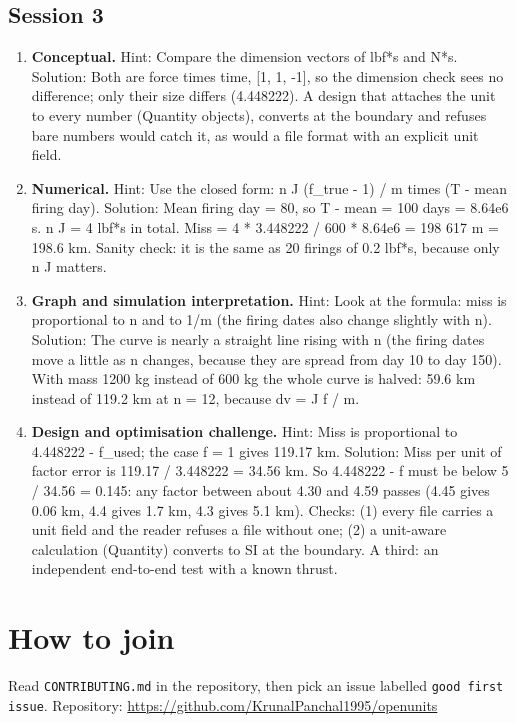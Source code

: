 \documentclass[11pt,a4paper]{article}
\begin{document}
\subsection*{Session 3}
\begin{enumerate}[nosep]
\item \textbf{Conceptual.} Hint: Compare the dimension vectors of lbf*s and N*s. Solution: Both are force times time, [1, 1, -1], so the dimension check sees no difference; only their size differs (4.448222). A design that attaches the unit to every number (Quantity objects), converts at the boundary and refuses bare numbers would catch it, as would a file format with an explicit unit field.
\item \textbf{Numerical.} Hint: Use the closed form: n J (f\_true - 1) / m times (T - mean firing day). Solution: Mean firing day = 80, so T - mean = 100 days = 8.64e6 s. n J = 4 lbf*s in total. Miss = 4 * 3.448222 / 600 * 8.64e6 = 198 617 m = 198.6 km. Sanity check: it is the same as 20 firings of 0.2 lbf*s, because only n J matters.
\item \textbf{Graph and simulation interpretation.} Hint: Look at the formula: miss is proportional to n and to 1/m (the firing dates also change slightly with n). Solution: The curve is nearly a straight line rising with n (the firing dates move a little as n changes, because they are spread from day 10 to day 150). With mass 1200 kg instead of 600 kg the whole curve is halved: 59.6 km instead of 119.2 km at n = 12, because dv = J f / m.
\item \textbf{Design and optimisation challenge.} Hint: Miss is proportional to \textbar{}4.448222 - f\_used\textbar{}; the case f = 1 gives 119.17 km. Solution: Miss per unit of factor error is 119.17 / 3.448222 = 34.56 km. So \textbar{}4.448222 - f\textbar{} must be below 5 / 34.56 = 0.145: any factor between about 4.30 and 4.59 passes (4.45 gives 0.06 km, 4.4 gives 1.7 km, 4.3 gives 5.1 km). Checks: (1) every file carries a unit field and the reader refuses a file without one; (2) a unit-aware calculation (Quantity) converts to SI at the boundary. A third: an independent end-to-end test with a known thrust.
\end{enumerate}

\section{How to join}
Read \texttt{CONTRIBUTING.md} in the repository, then pick an issue labelled \texttt{good first issue}. Repository: \url{https://github.com/KrunalPanchal1995/openunits}
\end{document}
